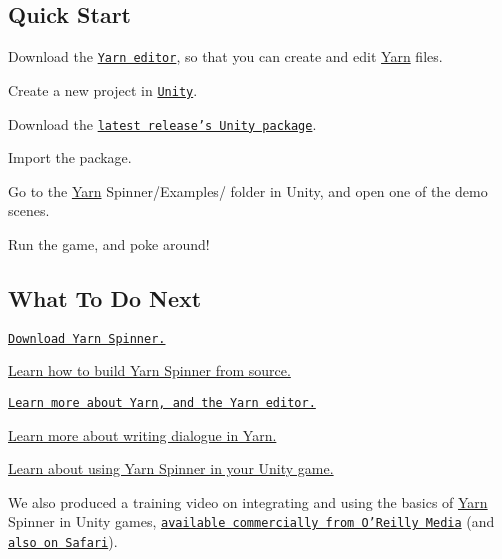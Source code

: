 \subsection*{Quick Start}


\begin{DoxyEnumerate}
\item Download the \href{https://github.com/InfiniteAmmoInc/Yarn}{\tt Yarn editor}, so that you can create and edit \hyperlink{a00026}{Yarn} files.
\end{DoxyEnumerate}
\begin{DoxyEnumerate}
\item Create a new project in \href{https://unity3d.com/get-unity}{\tt Unity}.
\item Download the \href{https://github.com/thesecretlab/YarnSpinner/releases}{\tt latest release's Unity package}.
\item Import the package.
\item Go to the {\ttfamily \hyperlink{a00026}{Yarn} Spinner/\-Examples/} folder in Unity, and open one of the demo scenes.
\item Run the game, and poke around!
\end{DoxyEnumerate}

\subsection*{What To Do Next}


\begin{DoxyItemize}
\item \href{https://github.com/thesecretlab/YarnSpinner/releases}{\tt Download Yarn Spinner.}
\item \hyperlink{a00006}{Learn how to build Yarn Spinner from source.}
\item \href{https://github.com/infiniteammoinc/Yarn}{\tt Learn more about Yarn, and the Yarn editor.}
\item \hyperlink{a00014}{Learn more about writing dialogue in Yarn.}
\item \hyperlink{a00012}{Learn about using Yarn Spinner in your Unity game.}
\end{DoxyItemize}

\href{http://shop.oreilly.com/product/0636920055105.do}{\tt }

We also produced a training video on integrating and using the basics of \hyperlink{a00026}{Yarn} Spinner in Unity games, \href{http://shop.oreilly.com/product/0636920055105.do}{\tt available commercially from O'Reilly Media} (and \href{https://www.safaribooksonline.com/library/view/creating-narrative-games/9781491969830/}{\tt also on Safari}).

